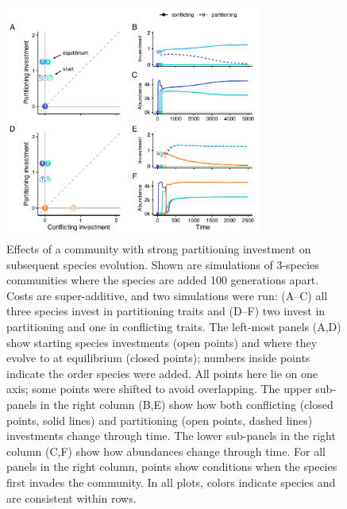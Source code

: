 \documentclass[11pt]{article}
\begin{document}
\begin{figure}[ht!]
\centering
\includegraphics[width=0.75\textwidth,keepaspectratio]{4-comm_inv.pdf}
\caption{Effects of a community with strong partitioning investment on subsequent species evolution. Shown are simulations of 3-species communities where the species are added 100 generations apart. Costs are super-additive, and two simulations were run: (A--C) all three species invest in partitioning traits and (D--F) two invest in partitioning and one in conflicting traits. The left-most panels (A,D) show starting species investments (open points) and where they evolve to at equilibrium (closed points); numbers inside points indicate the order species were added. All points here lie on one axis; some points were shifted to avoid overlapping. The upper sub-panels in the right column (B,E) show how both conflicting (closed points, solid lines) and partitioning (open points, dashed lines) investments change through time. The lower sub-panels in the right column (C,F) show how abundances change through time. For all panels in the right column, points show conditions when the species first invades the community. In all plots, colors indicate species and are consistent within rows.}
\label{fig:community-invasions-zero}
\end{figure}
\end{document}
